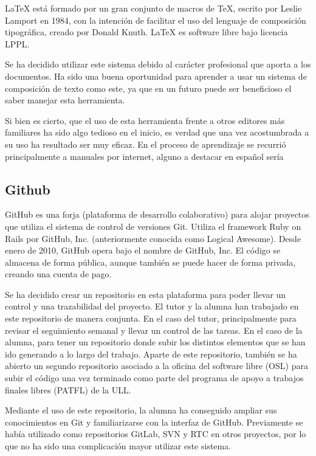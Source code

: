 \documentclass{article}
\begin{document}
LaTeX está formado por un gran conjunto de macros de TeX, escrito por Leslie Lamport en 1984, con la intención de facilitar el uso del lenguaje de composición tipográfica, creado por Donald Knuth. LaTeX es software libre bajo licencia LPPL.


Se ha decidido utilizar este sistema debido al carácter profesional que aporta a los documentos. Ha sido una buena oportunidad para aprender a usar un sistema de composición de texto como este, ya que en un futuro puede ser beneficioso el saber manejar esta herramienta. 


Si bien es cierto, que el uso de esta herramienta frente a otros editores más familiares ha sido algo tedioso en el inicio, es verdad que una vez acostumbrada a su uso ha resultado ser muy eficaz. En el proceso de aprendizaje se recurrió principalmente a manuales por internet, alguno a destacar en español sería

\subsection{Github}

GitHub es una forja (plataforma de desarrollo colaborativo) para alojar proyectos que utiliza el sistema de control de versiones Git. Utiliza el framework Ruby on Rails por GitHub, Inc. (anteriormente conocida como Logical Awesome). Desde enero de 2010, GitHub opera bajo el nombre de GitHub, Inc. El código se almacena de forma pública, aunque también se puede hacer de forma privada, creando una cuenta de pago.


Se ha decidido crear un repositorio en esta plataforma para poder llevar un control y una trazabilidad del proyecto. El tutor y la alumna han trabajado en este repositorio de manera conjunta. En el caso del tutor, principalmente para revisar el seguimiento semanal y llevar un control de las tareas. En el caso de la alumna, para tener un repositorio donde subir los distintos elementos que se han ido generando a lo largo del trabajo. Aparte de este repositorio, también se ha abierto un segundo repositorio asociado a la oficina del software libre (OSL) para subir el código una vez terminado como parte del programa de apoyo a trabajos finales libres (PATFL) de la ULL.


Mediante el uso de este repositorio, la alumna ha conseguido ampliar sus conocimientos en Git y familiarizarse con la interfaz de GitHub. Previamente se había utilizado como repositorios GitLab, SVN y RTC en otros proyectos, por lo que no ha sido una complicación mayor utilizar este sistema.
\end{document}
